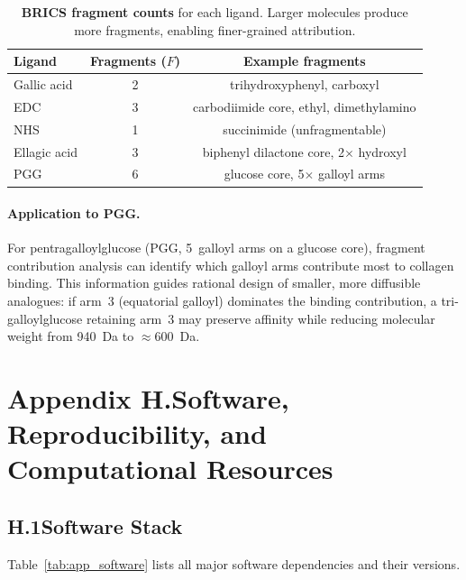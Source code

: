 \documentclass[11pt]{article}
\begin{document}
\begin{table}[H]
\small
\centering
\caption{\textbf{BRICS fragment counts} for each ligand.
  Larger molecules produce more fragments, enabling finer-grained
  attribution.}
\label{tab:app_fragments}
\begin{tabular}{lcc}
\toprule
\textbf{Ligand} & \textbf{Fragments ($F$)} & \textbf{Example fragments} \\
\midrule
Gallic acid     & 2 & trihydroxyphenyl, carboxyl \\
EDC             & 3 & carbodiimide core, ethyl, dimethylamino \\
NHS             & 1 & succinimide (unfragmentable) \\
Ellagic acid    & 3 & biphenyl dilactone core, 2$\times$ hydroxyl \\
PGG             & 6 & glucose core, 5$\times$ galloyl arms \\
\bottomrule
\end{tabular}
\end{table}

\paragraph{Application to PGG.}
For pentragalloylglucose (PGG, 5~galloyl arms on a glucose core),
fragment contribution analysis can identify which galloyl arms
contribute most to collagen binding.
This information guides rational design of smaller, more diffusible
analogues: if arm~3 (equatorial galloyl) dominates the binding
contribution, a tri-galloylglucose retaining arm~3 may preserve
affinity while reducing molecular weight from 940~Da to $\approx 600$~Da.

\label{app:rollout_end}

\section*{Appendix H.\quad Software, Reproducibility, and Computational Resources}
\label{app:software}

\subsection*{H.1\quad Software Stack}

Table~\ref{tab:app_software} lists all major software dependencies
and their versions.
\end{document}
